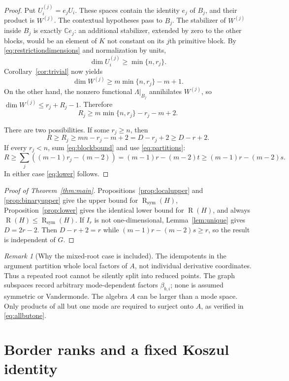 \documentclass[11pt]{article}
\theoremstyle{definition}
\theoremstyle{remark}
\newtheorem{remark}[theorem]{Remark}
\newcommand{\C}{\mathbb C}
\newcommand{\Rk}{\operatorname{R}}
\newcommand{\SR}{\operatorname{R}_{\mathrm{sym}}}
\begin{document}
\begin{proof}
Put $U_i^{(j)}=e_jU_i$. These spaces contain the identity $e_j$ of $B_j$,
and their product is $W^{(j)}$. The contextual hypotheses pass to $B_j$.
The stabilizer of $W^{(j)}$ inside $B_j$ is exactly $\C e_j$:
an additional stabilizer, extended by zero to the other blocks, would be an
element of $K$ not constant on its $j$th primitive block.
By \eqref{eq:restrictiondimensions} and normalization by units,
\[
 \dim U_i^{(j)}\ge\min\{n,r_j\}.
\]
Corollary~\ref{cor:trivial} now yields
\[
 \dim W^{(j)}\ge m\min\{n,r_j\}-m+1.
\]
On the other hand, the nonzero functional $\Lambda|_{B_j}$ annihilates
$W^{(j)}$, so $\dim W^{(j)}\le r_j+R_j-1$. Therefore
\begin{equation}\label{eq:blockbound}
 \boxed{\displaystyle R_j\ge m\min\{n,r_j\}-r_j-m+2.}
\end{equation}

There are two possibilities. If some $r_j\ge n$, then
\[
 R\ge R_j\ge mn-r_j-m+2=D-r_j+2\ge D-r+2.
\]
If every $r_j<n$, sum \eqref{eq:blockbound} and use \eqref{eq:partitions}:
\[
 R\ge\sum_j((m-1)r_j-(m-2))
   =(m-1)r-(m-2)t
   \ge(m-1)r-(m-2)s.
\]
In either case \eqref{eq:lower} follows.
\end{proof}

\begin{proof}[Proof of Theorem~\ref{thm:main}]
Propositions~\ref{prop:localupper} and \ref{prop:binaryupper} give the upper
bound for $\SR(H)$, Proposition~\ref{prop:lower} gives the identical lower
bound for $\Rk(H)$, and always $\Rk(H)\le\SR(H)$.
If $I_r$ is not one-dimensional, Lemma~\ref{lem:unique} gives $D=2r-2$.
Then $D-r+2=r$ while $(m-1)r-(m-2)s\ge r$, so the result is independent of $G$.
\end{proof}

\begin{remark}[Why the mixed-root case is included]
The idempotents in the argument partition whole local factors of $A$, not
individual derivative coordinates. Thus a repeated root cannot be silently
split into reduced points. The graph subspaces record arbitrary mode-dependent
factors $\beta_{b,i}$; none is assumed symmetric or Vandermonde.
The algebra $A$ can be larger than a mode space. Only products of all but one
mode are required to surject onto $A$, as verified in \eqref{eq:allbutone}.
\end{remark}

\section{Border ranks and a fixed Koszul identity}\label{sec:border}
\end{document}
